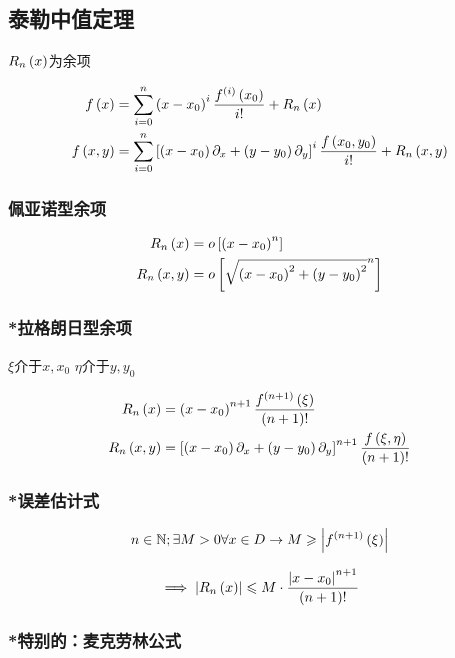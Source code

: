 \documentclass{article}
\begin{document}
\subsection{泰勒中值定理}

$R_n\left(x\right)$为余项

\[\begin{aligned}
        f\left(x\right)   & =\sum_{i=0}^n\left(x-x_0\right)^i\frac{f^{\left(i\right)}\left(x_0\right)}{i!}+R_n\left(x\right)                                                   \\
        f\left(x,y\right) & =\sum_{i=0}^n\left[\left(x-x_0\right)\partial_x+\left(y-y_0\right)\partial_y\right]^i\frac{f\left(x_0,y_0\right)}{i!}+R_n\left(x,y\right)\label{2}
    \end{aligned}\]

\subsubsection{佩亚诺型余项}

\[\begin{aligned}
        R_n\left(x\right)   & =
        o\left[\left(x-x_0\right)^n\right] \\
        R_n\left(x,y\right) & =
        o\left[\sqrt{\left(x-x_0\right)^2+\left(y-y_0\right)^2}^n\right]
    \end{aligned}\]

\subsubsection{*拉格朗日型余项\label{Lagrange}}

$\xi$介于$x,x_0$
$\eta$介于$y,y_0$

\[\begin{aligned}
        R_n\left(x\right)   & =
        \left(x-x_0\right)^{n+1}\frac{f^{\left(n+1\right)}\left(\xi\right)}{\left(n+1\right)!} \\
        R_n\left(x,y\right) & =
        \left[\left(x-x_0\right)\partial_x+\left(y-y_0\right)\partial_y\right]^{n+1}\frac{f\left(\xi,\eta\right)}{\left(n+1\right)!}
    \end{aligned}\]

\subsubsection{*误差估计式}

\[n\in\mathbb N;\exists M>0\forall x\in D\to M\geqslant\left|f^{\left(n+1\right)}\left(\xi\right)\right|\]

\[\implies\left|R_n\left(x\right)\right|\leqslant M\cdot\frac{\left|x-x_0\right|^{n+1}}{\left(n+1\right)!}\]

\subsubsection{*特别的：麦克劳林公式}
\end{document}
